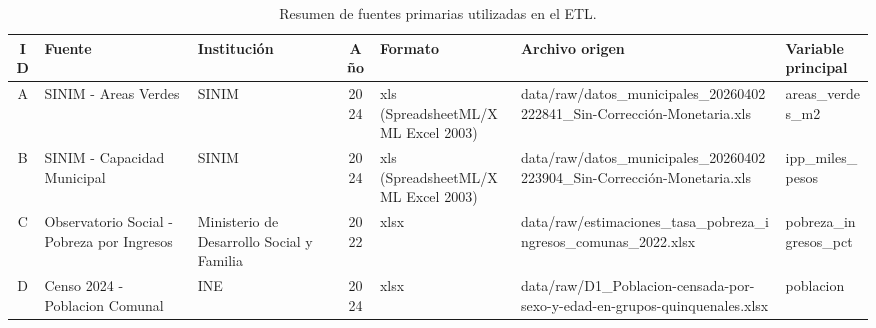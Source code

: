 \begin{table}[htbp]
\centering
\footnotesize
\caption{Resumen de fuentes primarias utilizadas en el ETL.}
\begin{tabular}{|c|p{3.0cm}|p{2.8cm}|c|p{2.2cm}|p{3.8cm}|p{2.2cm}|}
\hline
ID & Fuente & Institución & Año & Formato & Archivo origen & Variable principal \\
\hline
A & SINIM - Areas Verdes & SINIM & 2024 & xls (SpreadsheetML/XML Excel 2003) & data/raw/datos\_municipales\_20260402222841\_Sin-Corrección-Monetaria.xls & areas\_verdes\_m2 \\
B & SINIM - Capacidad Municipal & SINIM & 2024 & xls (SpreadsheetML/XML Excel 2003) & data/raw/datos\_municipales\_20260402223904\_Sin-Corrección-Monetaria.xls & ipp\_miles\_pesos \\
C & Observatorio Social - Pobreza por Ingresos & Ministerio de Desarrollo Social y Familia & 2022 & xlsx & data/raw/estimaciones\_tasa\_pobreza\_ingresos\_comunas\_2022.xlsx & pobreza\_ingresos\_pct \\
D & Censo 2024 - Poblacion Comunal & INE & 2024 & xlsx & data/raw/D1\_Poblacion-censada-por-sexo-y-edad-en-grupos-quinquenales.xlsx & poblacion \\
\hline
\end{tabular}
\end{table}
